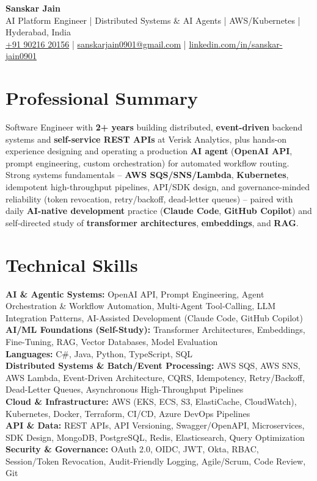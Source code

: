 \documentclass[a4paper,10pt]{article}
\begin{document}
\begin{center}
    {\LARGE \textbf{Sanskar Jain}} \\
    \vspace{2pt}
    AI Platform Engineer \;|\; Distributed Systems \& AI Agents \;|\; AWS/Kubernetes \;|\; Hyderabad, India \\
    \vspace{2pt}
    \href{tel:+919021620156}{+91 90216 20156} \;|\;
    \href{mailto:sanskarjain0901@gmail.com}{sanskarjain0901@gmail.com} \;|\;
    \href{https://www.linkedin.com/in/sanskar-jain0901/}{linkedin.com/in/sanskar-jain0901}
\end{center}

\section*{Professional Summary}
Software Engineer with \textbf{2+ years} building distributed, \textbf{event-driven} backend systems and \textbf{self-service REST APIs} at Verisk Analytics, plus hands-on experience designing and operating a production \textbf{AI agent} (\textbf{OpenAI API}, prompt engineering, custom orchestration) for automated workflow routing. Strong systems fundamentals -- \textbf{AWS SQS/SNS/Lambda}, \textbf{Kubernetes}, idempotent high-throughput pipelines, API/SDK design, and governance-minded reliability (token revocation, retry/backoff, dead-letter queues) -- paired with daily \textbf{AI-native development} practice (\textbf{Claude Code}, \textbf{GitHub Copilot}) and self-directed study of \textbf{transformer architectures}, \textbf{embeddings}, and \textbf{RAG}.

\section*{Technical Skills}
\begin{sloppypar}
\noindent
\textbf{AI \& Agentic Systems:} OpenAI API, Prompt Engineering, Agent Orchestration \& Workflow Automation, Multi-Agent Tool-Calling, LLM Integration Patterns, AI-Assisted Development (Claude Code, GitHub Copilot) \\
\textbf{AI/ML Foundations (Self-Study):} Transformer Architectures, Embeddings, Fine-Tuning, RAG, Vector Databases, Model Evaluation \\
\textbf{Languages:} C\#, Java, Python, TypeScript, SQL \\
\textbf{Distributed Systems \& Batch/Event Processing:} AWS SQS, AWS SNS, AWS Lambda, Event-Driven Architecture, CQRS, Idempotency, Retry/Backoff, Dead-Letter Queues, Asynchronous High-Throughput Pipelines \\
\textbf{Cloud \& Infrastructure:} AWS (EKS, ECS, S3, ElastiCache, CloudWatch), Kubernetes, Docker, Terraform, CI/CD, Azure DevOps Pipelines \\
\textbf{API \& Data:} REST APIs, API Versioning, Swagger/OpenAPI, Microservices, SDK Design, MongoDB, PostgreSQL, Redis, Elasticsearch, Query Optimization \\
\textbf{Security \& Governance:} OAuth 2.0, OIDC, JWT, Okta, RBAC, Session/Token Revocation, Audit-Friendly Logging, Agile/Scrum, Code Review, Git
\end{sloppypar}
\end{document}
